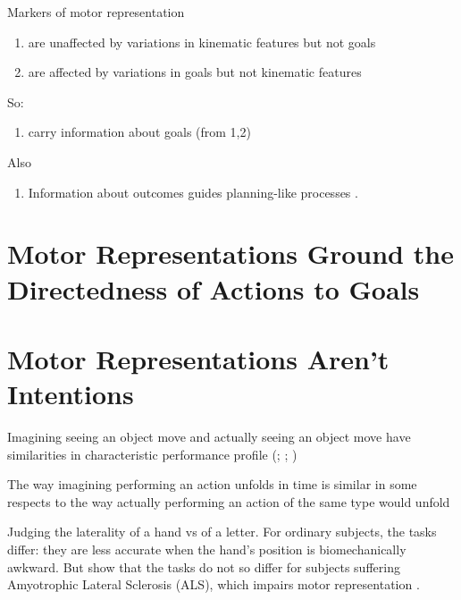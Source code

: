 \documentclass[12pt]{extarticle}
\begin{document}
\begin{multicols*}{3}
Markers of motor representation
\begin{enumerate}
\item are unaffected by variations in kinematic features but not goals
  \citep[e.g.][]{cattaneo:2010_state-dependent,umilta:2008pliers,cattaneo:2009_representation,rochat:2010_responses}
\item are affected by variations in goals but not kinematic features
  \citep[e.g.][]{Fogassi:2005nf,bonini:2010_ventral,cattaneo:2007_impairment,Umilta:2001zr,villiger:2010_activity,koch:2010_resonance}
\end{enumerate}
So:
\begin{enumerate}[resume]
\item carry information about goals (from 1,2)
\end{enumerate}
Also
\begin{enumerate}[resume]
\item Information about outcomes guides planning-like processes
  \citep[consider][]{grafton:2007_evidence,jeannerod:1988_neural,wolpert:1995internal, miall:1996_forward,arbib:1985_coordinated,mason:2001_hand,santello:2002_patterns}.
\end{enumerate}



\section{Motor Representations Ground the Directedness of Actions to Goals}



\section{Motor Representations Aren’t Intentions}

Imagining seeing an object move and actually seeing an object move have similarities in
characteristic performance profile
(\citealp{kosslyn:1978_measuring}; \citealp[p.\ 99ff]{kosslyn:1994_image}; \citealp{kosslyn:1978_visual})

The way imagining performing an action unfolds in time is
similar in some respects to the way actually performing an action of the same type would unfold
\citep{decety:1989_timing, decety:1996_imagined, Jeannerod:1994oz, parsons:1994_temporal,
frak:2001_orientation}

Judging the laterality of a hand vs of a letter.
For ordinary subjects, the tasks differ: they are less accurate
when the hand's position is biomechanically awkward.
But \citet{Fiori:2012fk} show that the tasks do not so differ for subjects suffering Amyotrophic
Lateral Sclerosis (ALS), which impairs motor representation \citep{parsons:1998_cerebrally}.


\end{multicols*}
\end{document}
